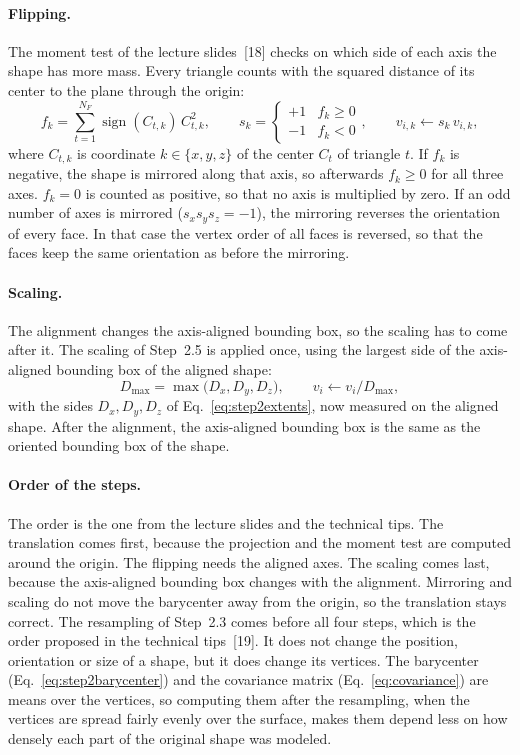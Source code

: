 \documentclass[10pt,a4paper]{article}
\begin{document}
\paragraph{Flipping.}
The moment test of the lecture slides~[18] checks on which side of each axis the shape has more mass. Every triangle counts with
the squared distance of its center to the plane through the origin:
\begin{equation}
  f_k=\sum_{t=1}^{N_F}\operatorname{sign}(C_{t,k})\,C_{t,k}^2,\qquad
  s_k=\begin{cases}+1 & f_k\ge 0\\-1 & f_k<0\end{cases},\qquad
  v_{i,k}\leftarrow s_k\,v_{i,k},
  \label{eq:flip}
\end{equation}
where $C_{t,k}$ is coordinate $k\in\{x,y,z\}$ of the center $C_t$ of triangle $t$. If $f_k$ is negative, the shape is mirrored along
that axis, so afterwards $f_k\ge0$ for all three axes. $f_k=0$ is counted as
positive, so that no axis is multiplied by zero. If an odd number of axes is mirrored ($s_xs_ys_z=-1$), the mirroring reverses the
orientation of every face. In that case the vertex order of all faces is reversed, so that the faces keep the same orientation as
before the mirroring.

\paragraph{Scaling.}
The alignment changes the axis-aligned bounding box, so the scaling has to come after it. The scaling of Step~2.5 is applied
once, using the largest side of the axis-aligned bounding box of the aligned shape:
\begin{equation}
  D_{\max}=\max\big(D_x,D_y,D_z\big),\qquad v_i\leftarrow v_i/D_{\max},
  \label{eq:dmax}
\end{equation}
with the sides $D_x,D_y,D_z$ of Eq.~\eqref{eq:step2extents}, now measured on the aligned shape.
After the alignment, the axis-aligned bounding box is the same as the oriented bounding box of the shape.

\paragraph{Order of the steps.}
The order is the one from the lecture slides and the technical tips. The translation comes first, because the projection and
the moment test are computed around the origin. The flipping needs the aligned axes. The scaling comes last, because the
axis-aligned bounding box changes with the alignment. Mirroring and scaling do not move the barycenter away from the origin, so the translation stays
correct. The resampling of Step~2.3 comes before all four steps, which is the order proposed in the technical tips~[19]. It does
not change the position, orientation or size of a shape, but it does change its vertices. The barycenter
(Eq.~\eqref{eq:step2barycenter}) and the covariance matrix (Eq.~\eqref{eq:covariance}) are means over the vertices, so
computing them after the resampling, when the vertices are spread fairly evenly over the surface, makes them depend less on how
densely each part of the original shape was modeled.
\end{document}

